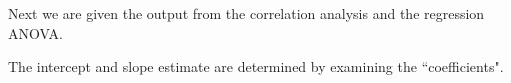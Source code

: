 Next we are given the output from the correlation analysis and the regression ANOVA.


The intercept and slope estimate are determined by examining the ``coefficients".













